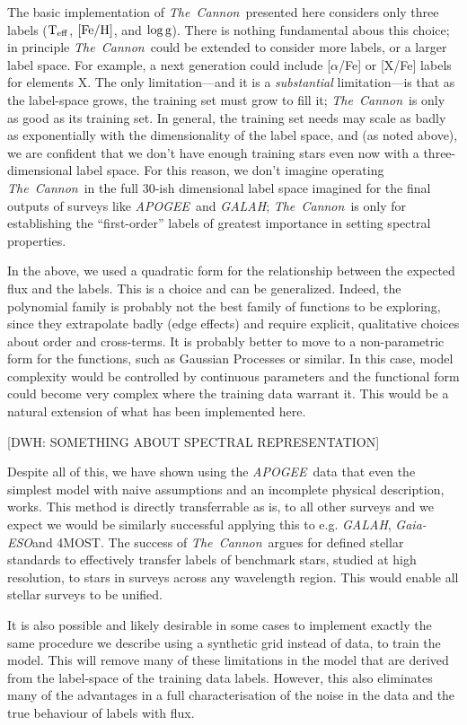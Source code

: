 \documentclass[12pt, preprint]{aastex}
\newcommand{\teff}{\mbox{$\rm T_{eff}$}}
\newcommand{\feh}{\mbox{$\rm [Fe/H]$}}
\newcommand{\logg}{\mbox{$\rm \log g$}}
\newcommand{\tc}{\textsl{The~Cannon}}
\newcommand{\apogee}{\textsl{APOGEE}}
\newcommand{\galah}{\textsl{GALAH}}
\newcommand{\gaiaeso}{\textsl{Gaia-ESO}}
\begin{document}
The basic implementation of \tc\ presented here considers only three
labels (\teff, \feh, and \logg).
There is nothing fundamental abous this choice; in principle
\tc\ could be extended to consider more labels, or a larger
label space.
For example, a next generation could include [$\alpha$/Fe] or [X/Fe]
labels for elements X.
The only limitation---and it is a \emph{substantial} limitation---is
that as the label-space grows, the training set must grow to fill it;
\tc\ is only as good as its training set.
In general, the training set needs may scale as badly as exponentially
with the dimensionality of the label space, and (as noted above), we
are confident that we don't have enough training stars even now with
a three-dimensional label space.
For this reason, we don't imagine operating \tc\ in the full 30-ish
dimensional label space imagined for the final outputs of surveys like
\apogee\ and \galah; \tc\ is only for establishing the ``first-order'' labels of
greatest importance in setting spectral properties.

In the above, we used a quadratic form for the
relationship between the expected flux and the labels.
This is a choice and can be generalized.
Indeed, the polynomial family is probably not the best family of
functions to be exploring, since they extrapolate badly (edge effects)
and require explicit, qualitative choices about order and cross-terms.
It is probably better to move to a non-parametric form for the functions,
such as Gaussian Processes or similar.
In this case, model complexity would be controlled by continuous
parameters and the functional form could become very complex where the
training data warrant it.
This would be a natural extension of what has been implemented here.

[DWH: SOMETHING ABOUT SPECTRAL REPRESENTATION]

Despite all of this, we have shown using the \apogee\ data that even the simplest model with naive assumptions and an incomplete physical description, works. 
This method is directly transferrable as is, to all other surveys and we expect we would be similarly successful applying this to e.g. \textit{GALAH}, \gaiaeso and 4MOST. 
The success of \tc\ argues for defined stellar standards to effectively transfer labels of benchmark stars, studied at high resolution, to stars in surveys across any wavelength region. 
This would enable all stellar surveys to be unified. 
 
 It is also possible and likely desirable in some cases to implement exactly the same procedure we describe using a synthetic grid instead of data, to train the model. 
 This will remove many of these limitations in the model that are derived from the label-space of the training data labels. However, this also eliminates many of the advantages in a full characterisation of the noise in the data and the true behaviour of labels with flux.
 
\end{document}
